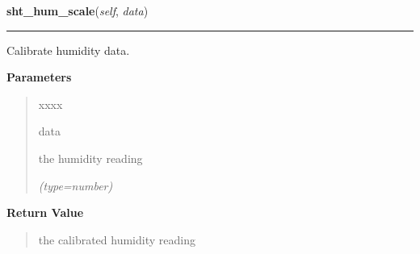     \label{sensor_thread:Sensor:sht_hum_scale}

    \vspace{0.5ex}

\hspace{.8\funcindent}\begin{boxedminipage}{\funcwidth}

    \raggedright \textbf{sht\_hum\_scale}(\textit{self}, \textit{data})

    \vspace{-1.5ex}

    \rule{\textwidth}{0.5\fboxrule}
\setlength{\parskip}{2ex}
    Calibrate humidity data.

\setlength{\parskip}{1ex}
      \textbf{Parameters}
      \vspace{-1ex}

      \begin{quote}
        \begin{Ventry}{xxxx}

          \item[data]

          the humidity reading

            {\it (type=number)}

        \end{Ventry}

      \end{quote}

      \textbf{Return Value}
    \vspace{-1ex}

      \begin{quote}
      the calibrated humidity reading

      \end{quote}

    \end{boxedminipage}

    \label{sensor_thread:Sensor:light_scale}

    \vspace{0.5ex}

